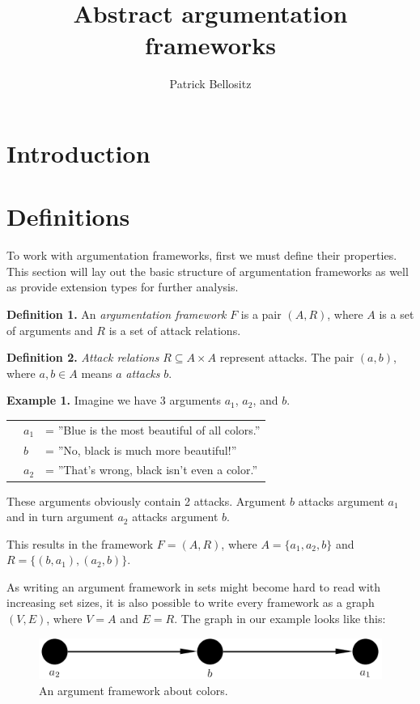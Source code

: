 \documentclass{article}
\newcommand{\nl}{\par\medskip\noindent}
\newcommand{\dl}{\par\bigskip\noindent}
\begin{document}
\title{Abstract argumentation frameworks}
\author{Patrick Bellositz}
\date{}
\maketitle

\section{Introduction}

\section{Definitions}

To work with argumentation frameworks, first we must define their properties. This section will lay out the basic structure of argumentation frameworks as well as provide extension types for further analysis.\nl

\noindent
\textbf{Definition 1.} An \emph{argumentation framework} $F$ is a pair $(A,R)$, where $A$ is a set of arguments and $R$ is a set of attack relations.\dl
\textbf{Definition 2.} \emph{Attack relations} $R\subseteq A\times A$ represent attacks. The pair $(a,b)$, where $a,b\in A$ means $a$ \emph{attacks} $b$.\dl
\textbf{Example 1.} Imagine we have 3 arguments $a_1$, $a_2$, and $b$.\nl
			\begin{tabular}{p{0.5cm}p{0.5cm}l}
			& $a_1$ & = ''Blue is the most beautiful of all colors.''\\
			& $b$ & = ''No, black is much more beautiful!''\\
			& $a_2$ & = ''That's wrong, black isn't even a color.''
			\end{tabular}\nl
These arguments obviously contain 2 attacks. Argument $b$ attacks argument $a_1$ and in turn argument $a_2$ attacks argument $b$.\nl
This results in the framework $F=(A,R)$, where $A=\{a_1,a_2,b\}$ and $R=\{(b,a_1),(a_2,b)\}$.\dl
As writing an argument framework in sets might become hard to read with increasing set sizes, it is also possible to write every framework as a graph $(V,E)$, where $V=A$ and $E=R$. The graph in our example looks like this:\dl

\FloatBarrier
	\begin{figure}[!htb]
		\centering
		\includegraphics[width=\linewidth]{graphs/ex1.png} %
		\caption{An argument framework about colors.}
	\end{figure}
\FloatBarrier
\end{document}
